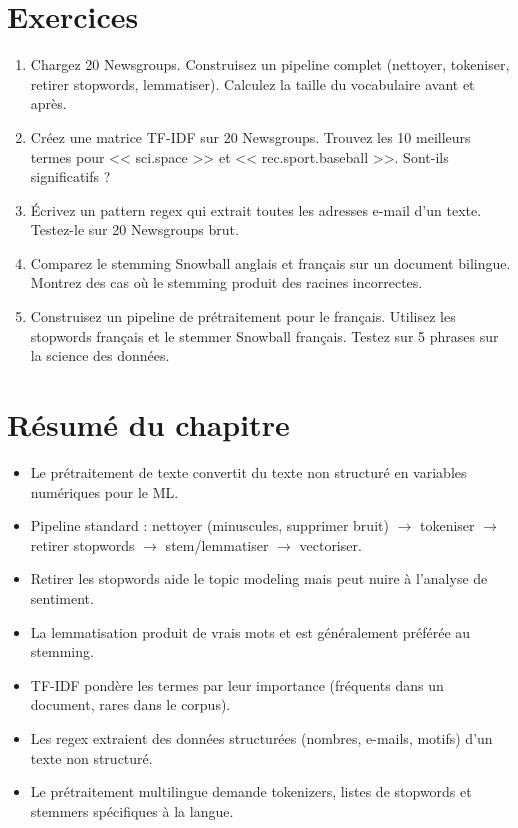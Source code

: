 \section{Exercices}

\begin{exercise}
\begin{enumerate}
  \item Chargez 20 Newsgroups. Construisez un pipeline complet (nettoyer, tokeniser, retirer stopwords, lemmatiser). Calculez la taille du vocabulaire avant et apr\`es.
  \item Cr\'eez une matrice TF-IDF sur 20 Newsgroups. Trouvez les 10 meilleurs termes pour << sci.space >> et << rec.sport.baseball >>. Sont-ils significatifs ?
  \item \'Ecrivez un pattern regex qui extrait toutes les adresses e-mail d'un texte. Testez-le sur 20 Newsgroups brut.
  \item Comparez le stemming Snowball anglais et fran\c{c}ais sur un document bilingue. Montrez des cas o\`u le stemming produit des racines incorrectes.
  \item Construisez un pipeline de pr\'etraitement pour le fran\c{c}ais. Utilisez les stopwords fran\c{c}ais et le stemmer Snowball fran\c{c}ais. Testez sur 5 phrases sur la science des donn\'ees.
\end{enumerate}
\end{exercise}

\section{R\'esum\'e du chapitre}

\begin{itemize}
  \item Le pr\'etraitement de texte convertit du texte non structur\'e en variables num\'eriques pour le ML.
  \item Pipeline standard : nettoyer (minuscules, supprimer bruit) $\to$ tokeniser $\to$ retirer stopwords $\to$ stem/lemmatiser $\to$ vectoriser.
  \item Retirer les stopwords aide le topic modeling mais peut nuire \`a l'analyse de sentiment.
  \item La lemmatisation produit de vrais mots et est g\'en\'eralement pr\'ef\'er\'ee au stemming.
  \item TF-IDF pond\`ere les termes par leur importance (fr\'equents dans un document, rares dans le corpus).
  \item Les regex extraient des donn\'ees structur\'ees (nombres, e-mails, motifs) d'un texte non structur\'e.
  \item Le pr\'etraitement multilingue demande tokenizers, listes de stopwords et stemmers sp\'ecifiques \`a la langue.
\end{itemize}
